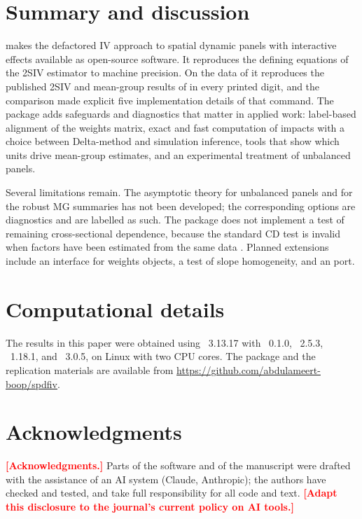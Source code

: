 \documentclass[article]{jss}
\newcommand{\todo}[1]{\textcolor{red}{\textbf{[#1]}}}
\begin{document}
\begin{table}[t!]
\centering\small

\caption{Computing time in seconds (best of three runs).}
\label{tab:timing}
\end{table}

\section{Summary and discussion} \label{sec:summary}

 makes the defactored IV approach to spatial dynamic panels
with interactive effects available as open-source software. It reproduces
the defining equations of the 2SIV estimator to machine precision. On the data of
\citet{Kripfganz+Sarafidis:2025} it reproduces the published 2SIV
and mean-group results of  in every printed digit, and
the comparison made explicit five implementation details of that command. The package adds safeguards and
diagnostics that matter in applied work: label-based
alignment of the weights matrix, exact and fast computation of impacts with
a choice between Delta-method and simulation inference, tools that show
which units drive mean-group estimates, and an experimental treatment of
unbalanced panels.

Several limitations remain. The asymptotic theory for unbalanced panels and
for the robust MG summaries has not been developed; the corresponding
options are diagnostics and are labelled as such. The package does not
implement a test of remaining cross-sectional dependence, because the
standard CD test is invalid when factors have been estimated from the same
data \citep{Juodis+Reese:2022}. Planned extensions include an interface for
 weights objects, a test of slope homogeneity, and an 
port.

\section*{Computational details}

The results in this paper were obtained using ~3.13.17
with ~0.1.0, ~2.5.3, ~1.18.1, and
~3.0.5, on Linux with two CPU cores. The package and the
replication materials are available from \url{https://github.com/abdulameert-boop/spdfiv}.

\section*{Acknowledgments}

\todo{Acknowledgments.} Parts of the software and of the manuscript were
drafted with the assistance of an AI system (Claude, Anthropic); the authors
have checked and tested, and take full responsibility for all code and text.
\todo{Adapt this disclosure to the journal's current policy on AI tools.}


\end{document}
